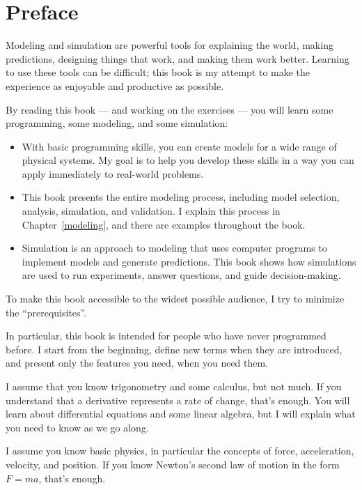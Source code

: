\chapter{Preface}


Modeling and simulation are powerful tools for explaining the world, making predictions, designing things that work, and making them work better.  Learning to use these tools can be difficult; this book is my attempt to make the experience as enjoyable and productive as possible.

By reading this book --- and working on the exercises --- you will learn some programming, some modeling, and some simulation:

\begin{itemize}

\item With basic programming skills, you can create models for a wide range of physical systems.
My goal is to help you develop these skills in a way you can apply immediately to real-world problems.

\item This book presents the entire modeling process, including model selection, analysis, simulation, and validation.  I explain this process in Chapter~\ref{modeling}, and there are examples throughout the book.

\item Simulation is an approach to modeling that uses computer programs to  implement models and generate predictions.  This book shows how simulations are used to run experiments, answer questions, and guide decision-making.

\end{itemize}

To make this book accessible to the widest possible audience, I try to minimize the ``prerequisites''.  

In particular, this book is intended for people who have never programmed before.  I start from the beginning, define new terms when they are introduced, and present only the features you need, when you need them.

I assume that you know trigonometry and some calculus, but not much.  If you understand that a derivative represents a rate of change, that's enough.  You will learn about differential equations and some linear algebra, but I will explain what you need to know as we go along.

I assume you know basic physics, in particular the concepts of force, acceleration, velocity, and position.  If you know Newton's second law of motion in the form $F = m a$, that's enough.

